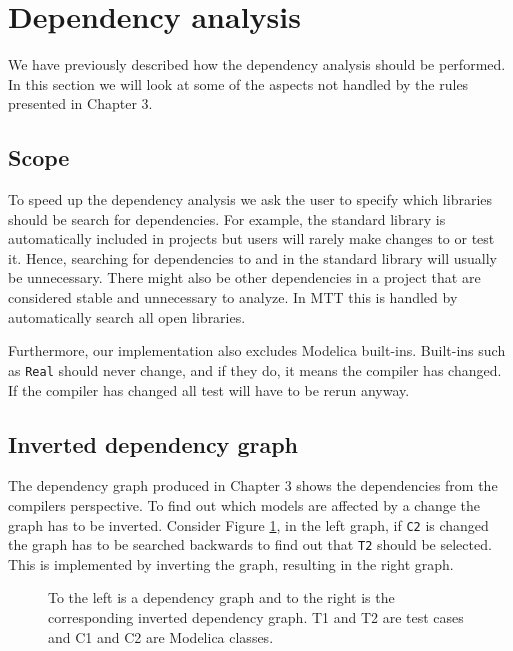 \documentclass{cslthse-msc}
\begin{document}
\section{Dependency analysis}
We have previously described how the dependency analysis should be performed. In this section we will look at some of the aspects not handled by the rules presented in Chapter 3.

\subsection{Scope}
To speed up the dependency analysis we ask the user to specify which libraries should be search for dependencies. For example, the standard library is automatically included in projects but users will rarely make changes to or test it. Hence, searching for dependencies to and in the standard library will usually be unnecessary. There might also be other dependencies in a project that are considered stable and unnecessary to analyze. In MTT this is handled by automatically search all open libraries.

Furthermore, our implementation also excludes Modelica built-ins. Built-ins such as \texttt{Real} should never change, and if they do, it means the compiler has changed. If the compiler has changed all test will have to be rerun anyway.

\subsection{Inverted dependency graph}
The dependency graph produced in Chapter 3 shows the dependencies from the compilers perspective. To find out which models are affected by a change the graph has to be inverted. Consider Figure \ref{fig:invertedGraph}, in the left graph, if \texttt{C2} is changed the graph has to be searched backwards to find out that \texttt{T2} should be selected. This is implemented by inverting the graph, resulting in the right graph.

\begin{figure}[!htbp]
    \centering
    \qquad
    \caption{To the left is a dependency graph and to the right is the corresponding inverted dependency graph. T1 and T2 are test cases and C1 and C2 are Modelica classes.}
    \label{fig:invertedGraph}
\end{figure}
\end{document}
